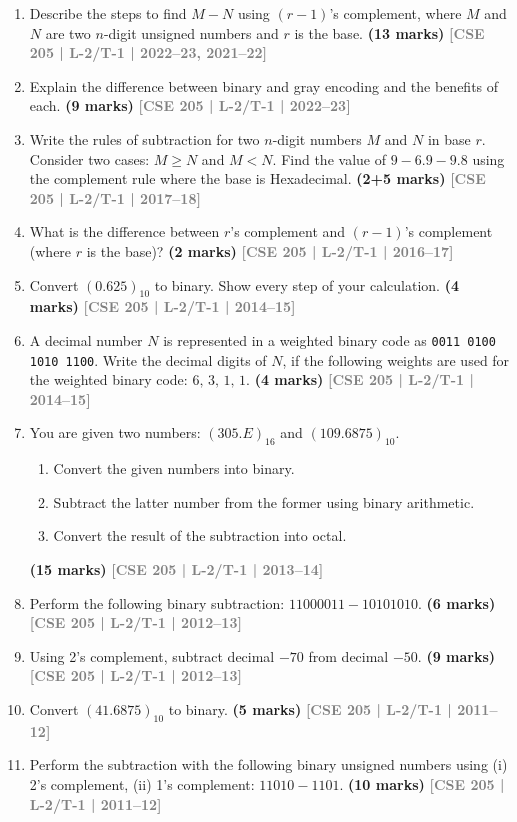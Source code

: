 \documentclass[12pt]{article}
\newcommand{\yr}[1]{\hfill\textcolor{gray}{\small\textbf{[#1]}}}
\newcommand{\mk}[1]{\textcolor{orange!70!black}{\small\textbf{(#1 marks)}}}
\begin{document}
\begin{enumerate}

\item Describe the steps to find $M - N$ using $(r-1)$'s complement, where $M$ and $N$ are two $n$-digit unsigned numbers and $r$ is the base.
\mk{13} \yr{CSE 205 | L-2/T-1 | 2022--23, 2021--22}

\item Explain the difference between binary and gray encoding and the benefits of each.
\mk{9} \yr{CSE 205 | L-2/T-1 | 2022--23}

\item Write the rules of subtraction for two $n$-digit numbers $M$ and $N$ in base $r$. Consider two cases: $M \geq N$ and $M < N$. Find the value of $9 - 6.9 - 9.8$ using the complement rule where the base is Hexadecimal.
\mk{2+5} \yr{CSE 205 | L-2/T-1 | 2017--18}

\item What is the difference between $r$'s complement and $(r-1)$'s complement (where $r$ is the base)? 
\mk{2} \yr{CSE 205 | L-2/T-1 | 2016--17}

\item Convert $(0.625)_{10}$ to binary. Show every step of your calculation.
\mk{4} \yr{CSE 205 | L-2/T-1 | 2014--15}

\item A decimal number $N$ is represented in a weighted binary code as \texttt{0011 0100 1010 1100}. Write the decimal digits of $N$, if the following weights are used for the weighted binary code: $6,\,3,\,1,\,1$.
\mk{4} \yr{CSE 205 | L-2/T-1 | 2014--15}

\item You are given two numbers: $(305.E)_{16}$ and $(109.6875)_{10}$.
\begin{enumerate}
  \item Convert the given numbers into binary.
  \item Subtract the latter number from the former using binary arithmetic.
  \item Convert the result of the subtraction into octal.
\end{enumerate}
\mk{15} \yr{CSE 205 | L-2/T-1 | 2013--14}

\item Perform the following binary subtraction: $11000011 - 10101010$.
\mk{6} \yr{CSE 205 | L-2/T-1 | 2012--13}

\item Using 2's complement, subtract decimal $-70$ from decimal $-50$.
\mk{9} \yr{CSE 205 | L-2/T-1 | 2012--13}

\item Convert $(41.6875)_{10}$ to binary.
\mk{5} \yr{CSE 205 | L-2/T-1 | 2011--12}

\item Perform the subtraction with the following binary unsigned numbers using (i) 2's complement, (ii) 1's complement: $11010 - 1101$.
\mk{10} \yr{CSE 205 | L-2/T-1 | 2011--12}

\end{enumerate}
\end{document}

